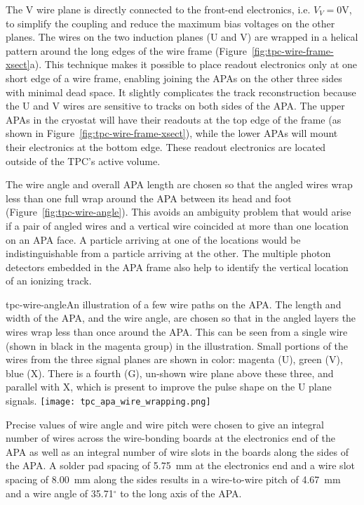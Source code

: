 The V wire plane is directly connected to the front-end electronics, i.e. $V_V=0$V, to simplify the coupling and 
reduce the maximum bias voltages on the other planes. The wires on the two induction planes (U and V) are wrapped in a helical pattern around the long edges of the wire frame 
(Figure~\ref{fig:tpc-wire-frame-xsect}a). This technique makes it possible to place readout 
electronics only at one short edge of a wire frame, enabling joining the APAs on the other three sides with minimal dead space.  It slightly complicates 
the track reconstruction because the U and V wires are sensitive to tracks on 
both sides of the APA.  The upper APAs in the cryostat will have their readouts
at the top edge of the frame (as shown in Figure~\ref{fig:tpc-wire-frame-xsect}), 
while the lower APAs will mount their electronics at the bottom edge.  These readout electronics are located outside of the TPC's active volume.

The wire angle and overall APA length are chosen so that the angled wires wrap less than one full wrap around the APA between its head and foot (Figure~\ref{fig:tpc-wire-angle}).  This avoids an ambiguity problem that would arise if a pair of angled wires and a vertical wire coincided at more than one location on an APA face.  A particle arriving at one of the locations would be indistinguishable from a particle arriving at the other.  The multiple photon detectors embedded in the APA frame also help to identify the vertical location of an ionizing track.

\begin{cdrfigure}{tpc-wire-angle}{An illustration of a few wire paths on the APA.  The length and width of the APA, and the wire angle, are chosen so that in the angled layers the wires wrap less than once around the APA.  This can be seen from a single wire (shown in black in the magenta group) in the illustration.  Small portions of the wires from the three signal planes are shown in color: magenta (U), green (V), blue (X).  There is a fourth (G), un-shown wire plane above these three, and parallel with X, which is present to improve the pulse shape on the U plane signals.}
\texttt{[image: tpc\_apa\_wire\_wrapping.png]}
\end{cdrfigure}

Precise values of wire angle and wire pitch were chosen to give an integral number of wires across the wire-bonding boards at the electronics end of the APA as well as an integral number of wire slots in the boards along the sides of the APA.  A solder pad spacing of 5.75~mm at the electronics end and a wire slot spacing of 8.00~mm along the sides results in a wire-to-wire pitch of 4.67~mm and a wire angle of 35.71$^\circ$ to the long axis of the APA.


